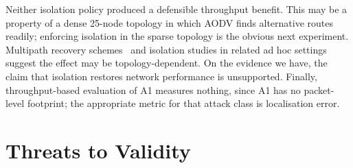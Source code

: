 Neither isolation policy produced a defensible throughput benefit. This may be
a property of a dense 25-node topology in which AODV finds alternative routes
readily; enforcing isolation in the sparse topology is the obvious next
experiment.
Multipath recovery schemes~\cite{sirajuddin2021tbsmr} and isolation studies in
related ad hoc settings~\cite{kavitha2019india,buksh2024trust} suggest the
effect may be topology-dependent. On the evidence we have, the claim that
isolation restores network performance is unsupported. Finally,
throughput-based evaluation of A1 measures nothing, since A1 has no
packet-level footprint; the appropriate metric for that attack class is
localisation error.

\section{Threats to Validity}
\label{sec:threats}

